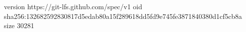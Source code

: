 version https://git-lfs.github.com/spec/v1
oid sha256:132682592830817d5edab80a15f289618dd5fd9e745fe3871840380d1cf5cb8a
size 30281
